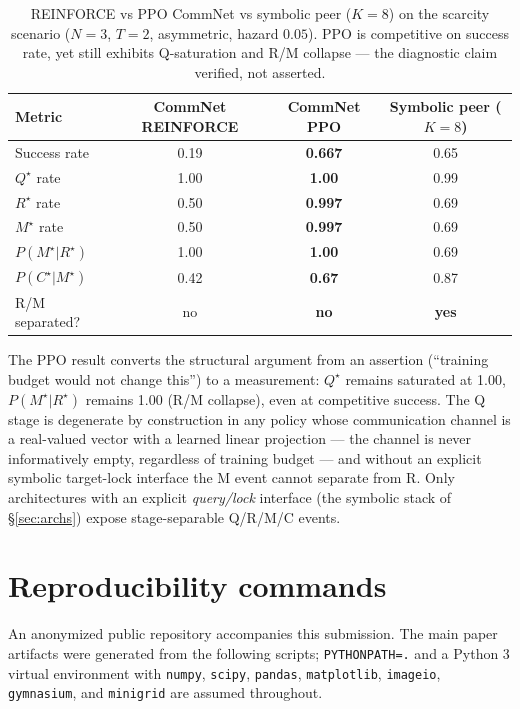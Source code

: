 \documentclass{article}
\begin{document}
\begin{table}[h]
\centering
\small
\caption{REINFORCE vs PPO CommNet vs symbolic peer ($K{=}8$) on the scarcity scenario ($N{=}3$, $T{=}2$, asymmetric, hazard $0.05$). PPO is competitive on success rate, yet still exhibits Q-saturation and R/M collapse --- the diagnostic claim verified, not asserted.}
\label{tab:ppo-commnet}
\begin{tabular}{l c c c}
\toprule
Metric & CommNet REINFORCE & \textbf{CommNet PPO} & Symbolic peer ($K{=}8$) \\
\midrule
Success rate                  & 0.19   & \textbf{0.667} & 0.65 \\
$Q^\star$ rate                & 1.00   & \textbf{1.00}  & 0.99 \\
$R^\star$ rate                & 0.50   & \textbf{0.997} & 0.69 \\
$M^\star$ rate                & 0.50   & \textbf{0.997} & 0.69 \\
$P(M^\star|R^\star)$          & 1.00   & \textbf{1.00}  & 0.69 \\
$P(C^\star|M^\star)$          & 0.42   & \textbf{0.67}  & 0.87 \\
R/M separated?                & no     & \textbf{no}    & \textbf{yes} \\
\bottomrule
\end{tabular}
\end{table}

The PPO result converts the structural argument from an assertion (``training budget would not change this'') to a measurement: $Q^\star$ remains saturated at 1.00, $P(M^\star|R^\star)$ remains 1.00 (R/M collapse), even at competitive success. The Q stage is degenerate by construction in any policy whose communication channel is a real-valued vector with a learned linear projection --- the channel is never informatively empty, regardless of training budget --- and without an explicit symbolic target-lock interface the M event cannot separate from R. Only architectures with an explicit \emph{query/lock} interface (the symbolic stack of \S\ref{sec:archs}) expose stage-separable Q/R/M/C events.

\section{Reproducibility commands}
\label{app:repro}

An anonymized public repository accompanies this submission. The main paper artifacts were generated from the following scripts; \texttt{PYTHONPATH=.} and a Python 3 virtual environment with \texttt{numpy}, \texttt{scipy}, \texttt{pandas}, \texttt{matplotlib}, \texttt{imageio}, \texttt{gymnasium}, and \texttt{minigrid} are assumed throughout.
\end{document}
